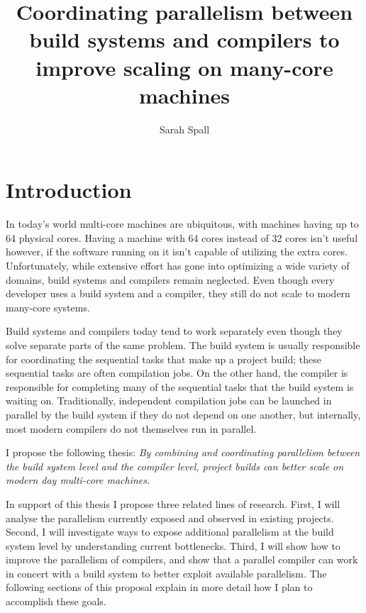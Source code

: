 \documentclass[10pt]{article}
\begin{document}
\title{Coordinating parallelism between build systems and compilers to improve scaling on many-core machines}
\author{Sarah Spall}
\date{}
\maketitle

\section{Introduction}

In today's world multi-core machines are ubiquitous, with machines having up to 64 physical cores.
Having a machine with 64 cores instead of 32 cores isn't useful however, if the software running
on it isn't capable of utilizing the extra cores.  Unfortunately, while extensive effort
has gone into optimizing a wide variety of domains, build systems and compilers remain
neglected. Even though every developer
uses a build system and a compiler, they still do not scale to modern many-core systems.

Build systems and compilers today tend to work separately even though they solve
separate parts of the same problem.  The build system is usually responsible for coordinating
the sequential tasks that make up a project build; these sequential tasks are often
compilation jobs.  On the other hand, the compiler is responsible for completing many of the sequential
tasks that the build system is waiting on.  Traditionally, independent compilation jobs can be
launched in parallel by the build system if they do not depend on one another, but internally,
most modern compilers do not themselves run in parallel.

I propose the following thesis: \emph{By combining and coordinating parallelism between the build system level
and the compiler level, project builds can better scale on modern day multi-core
machines.}

In support of this thesis I propose three related lines of research.  First, I will analyse the parallelism
currently exposed and observed in existing projects.  Second, I will investigate ways to expose
additional parallelism at the build system level by understanding current bottlenecks.  Third, I will show how to improve the
parallelism of compilers, and show that a parallel compiler can work
in concert with a build system to better exploit available parallelism.  The following
sections of this proposal explain in more detail how I plan to accomplish these goals.
\end{document}
